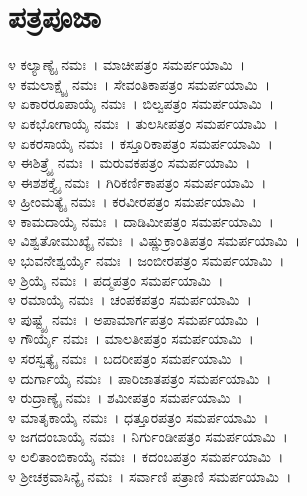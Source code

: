 \section{ಪತ್ರಪೂಜಾ}
೪ ಕಲ್ಯಾಣ್ಯೈ ನಮಃ~। ಮಾಚೀಪತ್ರಂ ಸಮರ್ಪಯಾಮಿ~।\\
೪ ಕಮಲಾಕ್ಷ್ಯೈ ನಮಃ~। ಸೇವಂತಿಕಾಪತ್ರಂ ಸಮರ್ಪಯಾಮಿ~।\\
೪ ಏಕಾರರೂಪಾಯೈ ನಮಃ~। ಬಿಲ್ವಪತ್ರಂ ಸಮರ್ಪಯಾಮಿ~।\\
೪ ಏಕಭೋಗಾಯೈ ನಮಃ~। ತುಲಸೀಪತ್ರಂ ಸಮರ್ಪಯಾಮಿ~।\\
೪ ಏಕರಸಾಯೈ ನಮಃ~। ಕಸ್ತೂರಿಕಾಪತ್ರಂ ಸಮರ್ಪಯಾಮಿ~।\\
೪ ಈಶಿತ್ರ್ಯೈ ನಮಃ~। ಮರುವಕಪತ್ರಂ ಸಮರ್ಪಯಾಮಿ~।\\
೪ ಈಶಶಕ್ತ್ಯೈ ನಮಃ~। ಗಿರಿಕರ್ಣಿಕಾಪತ್ರಂ ಸಮರ್ಪಯಾಮಿ~।\\
೪ ಹ್ರೀಂಮತ್ಯೈ ನಮಃ~। ಕರವೀರಪತ್ರಂ ಸಮರ್ಪಯಾಮಿ~।\\
೪ ಕಾಮದಾಯೈ ನಮಃ~। ದಾಡಿಮೀಪತ್ರಂ ಸಮರ್ಪಯಾಮಿ~।\\
೪ ವಿಶ್ವತೋಮುಖ್ಯೈ ನಮಃ~। ವಿಷ್ಣುಕ್ರಾಂತಿಪತ್ರಂ ಸಮರ್ಪಯಾಮಿ~।\\
೪ ಭುವನೇಶ್ವರ್ಯೈ ನಮಃ~। ಜಂಬೀರಪತ್ರಂ ಸಮರ್ಪಯಾಮಿ~।\\
೪ ಶ್ರಿಯೈ ನಮಃ~। ಪದ್ಮಪತ್ರಂ ಸಮರ್ಪಯಾಮಿ~।\\
೪ ರಮಾಯೈ ನಮಃ~। ಚಂಪಕಪತ್ರಂ ಸಮರ್ಪಯಾಮಿ~।\\
೪ ಪುಷ್ಟ್ಯೈ ನಮಃ~। ಅಪಾಮಾರ್ಗಪತ್ರಂ ಸಮರ್ಪಯಾಮಿ~।\\
೪ ಗೌರ್ಯೈ ನಮಃ~। ಮಾಲತೀಪತ್ರಂ ಸಮರ್ಪಯಾಮಿ~।\\
೪ ಸರಸ್ವತ್ಯೈ ನಮಃ~। ಬದರೀಪತ್ರಂ ಸಮರ್ಪಯಾಮಿ~।\\
೪ ದುರ್ಗಾಯೈ ನಮಃ~। ಪಾರಿಜಾತಪತ್ರಂ ಸಮರ್ಪಯಾಮಿ~।\\
೪ ರುದ್ರಾಣ್ಯೈ ನಮಃ~। ಶಮೀಪತ್ರಂ ಸಮರ್ಪಯಾಮಿ~।\\
೪ ಮಾತೃಕಾಯೈ ನಮಃ~। ಧತ್ತೂರಪತ್ರಂ ಸಮರ್ಪಯಾಮಿ~।\\
೪ ಜಗದಂಬಾಯೈ ನಮಃ~। ನಿರ್ಗುಂಡೀಪತ್ರಂ ಸಮರ್ಪಯಾಮಿ~।\\
೪ ಲಲಿತಾಂಬಿಕಾಯೈ ನಮಃ~। ಕದಂಬಪತ್ರಂ ಸಮರ್ಪಯಾಮಿ~।\\
೪ ಶ್ರೀಚಕ್ರವಾಸಿನ್ಯೈ ನಮಃ~। ಸರ್ವಾಣಿ ಪತ್ರಾಣಿ ಸಮರ್ಪಯಾಮಿ~।
